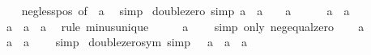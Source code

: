 \begin{isabellebody}
%
\isadelimproof
\ \ %
\endisadelimproof
%
\isatagproof
{}\isamarkupfalse%
\ neg{\isacharunderscore}{\kern0pt}less{\isacharunderscore}{\kern0pt}pos\ {\isacharbrackleft}{\kern0pt}of\ {\isachardoublequoteopen}{\isacharminus}{\kern0pt}\ a{\isachardoublequoteclose}{\isacharbrackright}{\kern0pt}\ \isamarkupfalse%
\ simp%
\endisatagproof
{\isafoldproof}%
%
\isadelimproof
\isanewline
%
\endisadelimproof
\isanewline
{}\isamarkupfalse%
\ double{\isacharunderscore}{\kern0pt}zero\ {\isacharbrackleft}{\kern0pt}simp{\isacharbrackright}{\kern0pt}{\isacharcolon}{\kern0pt}\ {\isachardoublequoteopen}a\ {\isacharplus}{\kern0pt}\ a\ {\isacharequal}{\kern0pt}\ {}\ {\isasymlongleftrightarrow}\ a\ {\isacharequal}{\kern0pt}\ {}{\isachardoublequoteclose}\isanewline
%
\isadelimproof
%
\endisadelimproof
%
\isatagproof
{}\isamarkupfalse%
\isanewline
\ \ \isamarkupfalse%
\ {\isachardoublequoteopen}a\ {\isacharplus}{\kern0pt}\ a\ {\isacharequal}{\kern0pt}\ {}{\isachardoublequoteclose}\isanewline
\ \ \isamarkupfalse%
\ \isamarkupfalse%
\ a{\isacharcolon}{\kern0pt}\ {\isachardoublequoteopen}{\isacharminus}{\kern0pt}\ a\ {\isacharequal}{\kern0pt}\ a{\isachardoublequoteclose}\ \isamarkupfalse%
\ {\isacharparenleft}{\kern0pt}rule\ minus{\isacharunderscore}{\kern0pt}unique{\isacharparenright}{\kern0pt}\isanewline
\ \ \isamarkupfalse%
\ \isamarkupfalse%
\ {\isachardoublequoteopen}a\ {\isacharequal}{\kern0pt}\ {}{\isachardoublequoteclose}\ \isamarkupfalse%
\ {\isacharparenleft}{\kern0pt}simp\ only{\isacharcolon}{\kern0pt}\ neg{\isacharunderscore}{\kern0pt}equal{\isacharunderscore}{\kern0pt}zero{\isacharparenright}{\kern0pt}\isanewline
{}\isamarkupfalse%
\isanewline
\ \ \isamarkupfalse%
\ {\isachardoublequoteopen}a\ {\isacharequal}{\kern0pt}\ {}{\isachardoublequoteclose}\isanewline
\ \ \isamarkupfalse%
\ \isamarkupfalse%
\ {\isachardoublequoteopen}a\ {\isacharplus}{\kern0pt}\ a\ {\isacharequal}{\kern0pt}\ {}{\isachardoublequoteclose}\ \isamarkupfalse%
\ simp\isanewline
{}\isamarkupfalse%
%
\endisatagproof
{\isafoldproof}%
%
\isadelimproof
\isanewline
%
\endisadelimproof
\isanewline
{}\isamarkupfalse%
\ double{\isacharunderscore}{\kern0pt}zero{\isacharunderscore}{\kern0pt}sym\ {\isacharbrackleft}{\kern0pt}simp{\isacharbrackright}{\kern0pt}{\isacharcolon}{\kern0pt}\ {\isachardoublequoteopen}{}\ {\isacharequal}{\kern0pt}\ a\ {\isacharplus}{\kern0pt}\ a\ {\isasymlongleftrightarrow}\ a\ {\isacharequal}{\kern0pt}\ {}{\isachardoublequoteclose}\isanewline

\end{isabellebody}
